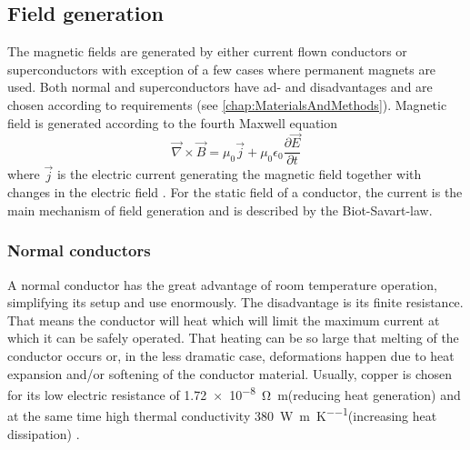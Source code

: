             \subsection{Field generation}
                The magnetic fields are generated by either current flown conductors or superconductors with exception of a few cases where permanent magnets are used. Both normal and superconductors have ad- and disadvantages and are chosen according to requirements (see \ref{chap:MaterialsAndMethods}). Magnetic field is generated according to the fourth Maxwell equation
                \begin{equation}
                    \label{equation:theory:maxwell}
                    \vec\nabla\times\vec B = \mu_0\vec j+\mu_0\epsilon_0\frac{\partial\vec E}{\partial t}
                \end{equation}
                where $\vec j$ is the electric current generating the magnetic field together with changes in the electric field \cite{b.i._bleaney__b._bleaney_electricity_nodate}. For the static field of a conductor, the current is the main mechanism of field generation and is described by the Biot-Savart-law.
            \subsubsection{Normal conductors}
                A normal conductor has the great advantage of room temperature operation, simplifying its setup and use enormously. The disadvantage is  its finite resistance. That means the conductor will heat which will limit the maximum current at which it can be safely operated.  That heating can be so large that melting of the conductor occurs or, in the less dramatic case, deformations happen due to heat expansion and/or softening of the conductor material. Usually, copper is chosen for its low electric resistance of \SI{1.72e-8}{\ohm\meter}(reducing heat generation) and at the same time high thermal conductivity \SI{380}{\watt\per\m\per\kelvin}(increasing heat dissipation) \cite{schofield_f._h._thermal_1925}.
